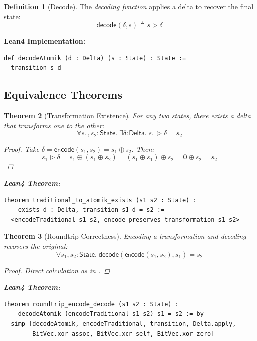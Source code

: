 \documentclass[11pt,letterpaper]{article}
\theoremstyle{plain}
\newtheorem{theorem}{Theorem}[section]
\theoremstyle{definition}
\newtheorem{definition}[theorem]{Definition}
\theoremstyle{remark}
\newcommand{\dzero}{\mathbf{0}}          %
\newcommand{\transition}{\triangleright} %
\newcommand{\StateType}{\mathsf{State}}
\newcommand{\DeltaType}{\mathsf{Delta}}
\begin{document}
\begin{definition}[Decode]
\label{def:decode}
The \emph{decoding function} applies a delta to recover the final state:
\[
\mathsf{decode}(\delta, s) \triangleq s \transition \delta
\]

\noindent\textbf{Lean4 Implementation:}
\begin{lstlisting}
def decodeAtomik (d : Delta) (s : State) : State :=
  transition s d
\end{lstlisting}
\end{definition}

\subsection{Equivalence Theorems}

\begin{theorem}[Transformation Existence]
\label{thm:transform-exists}
For any two states, there exists a delta that transforms one to the other:
\[
\forall s_1, s_2 : \StateType.\; \exists \delta : \DeltaType.\; s_1 \transition \delta = s_2
\]

\begin{proof}
Take $\delta = \mathsf{encode}(s_1, s_2) = s_1 \oplus s_2$. Then:
\[
s_1 \transition \delta = s_1 \oplus (s_1 \oplus s_2) = (s_1 \oplus s_1) \oplus s_2 = \dzero \oplus s_2 = s_2
\]
\end{proof}

\medskip
\noindent\textbf{Lean4 Theorem:}
\begin{lstlisting}
theorem traditional_to_atomik_exists (s1 s2 : State) :
    exists d : Delta, transition s1 d = s2 :=
  <encodeTraditional s1 s2, encode_preserves_transformation s1 s2>
\end{lstlisting}
\end{theorem}

\begin{theorem}[Roundtrip Correctness]
\label{thm:roundtrip}
Encoding a transformation and decoding recovers the original:
\[
\forall s_1, s_2 : \StateType.\; \mathsf{decode}(\mathsf{encode}(s_1, s_2), s_1) = s_2
\]

\begin{proof}
Direct calculation as in .
\end{proof}

\medskip
\noindent\textbf{Lean4 Theorem:}
\begin{lstlisting}
theorem roundtrip_encode_decode (s1 s2 : State) :
    decodeAtomik (encodeTraditional s1 s2) s1 = s2 := by
  simp [decodeAtomik, encodeTraditional, transition, Delta.apply,
        BitVec.xor_assoc, BitVec.xor_self, BitVec.xor_zero]
\end{lstlisting}
\end{theorem}
\end{document}
